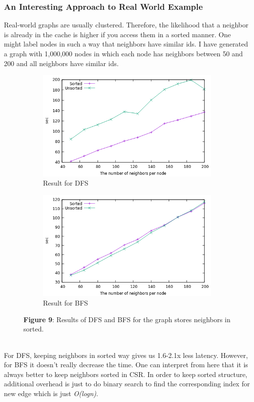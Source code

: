 \documentclass{article}
\begin{document}
\subsubsection*{An Interesting Approach to Real World Example} 
 Real-world graphs are usually clustered. Therefore, the likelihood that a neighbor is already in the cache is higher if you access them in a sorted manner. One might label nodes in such a way that neighbors have similar ids. I have generated a graph with 1,000,000 nodes in which each node has neighbors between 50 and 200 and all neighbors have similar ids. 
 \begin{figure}[h]
\begin{subfigure}[h]{0.5\textwidth}
\includegraphics[scale = 0.45]{DFS_sorted}
\caption{Result for DFS}\label{fig:figA}
\end{subfigure}
\begin{subfigure}[h]{0.6\textwidth}
\includegraphics[scale = 0.45]{BFS_sorted}
\caption{Result for BFS}\label{fig:figB}
\end{subfigure}
\caption*{\textbf{Figure 9}: Results of DFS and BFS for the graph stores neighbors in sorted.}
\end{figure} \\
 For DFS, keeping neighbors in sorted way gives us 1.6-2.1x less latency. However, for BFS it doesn't really decrease the time. One can interpret from here that it is always better to keep neighbors sorted in CSR. In order to keep sorted structure, additional overhead is just to do binary search to find the corresponding index for new edge which is just \textit{O(logn)}. 
 
\end{document}
